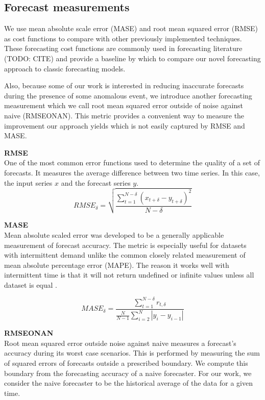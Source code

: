 \subsection{Forecast measurements}
We use mean absolute scale error (MASE) \cite{Hyndman2006, Hyndman2006a} and root mean squared error (RMSE) as cost functions to compare with other previously implemented techniques.  These forecasting cost functions are commonly used in forecasting literature (TODO: CITE) and provide a baseline by which to compare our novel forecasting approach to classic forecasting models.  

Also, because some of our work is interested in reducing inaccurate forecasts during the presence of some anomalous event, we introduce another forecasting measurement which we call root mean squared error outside of noise against naive (RMSEONAN).  This metric provides a convenient way to measure the improvement our approach yields which is not easily captured by RMSE and MASE.

\bigskip
\noindent \textbf{RMSE} \\
One of the most common error functions used to determine the quality of a set of forecasts.  It measures the average difference between two time series.  In this case, the input series $x$ and the forecast series $y$.
\begin{equation}
RMSE_{\delta} = \sqrt{\frac{\sum_{t = 1}^{N - \delta}{(x_{t + \delta} - y_{t + \delta})^{2}}}{N - \delta}}
\end{equation}

\bigskip
\noindent \textbf{MASE} \\
Mean absolute scaled error was developed to be a generally applicable measurement of forecast accuracy.  The metric is especially useful for datasets with intermittent demand unlike the common closely related measurement of mean absolute percentage error (MAPE).  The reason it works well with intermittent time is that it will not return undefined or infinite values unless all dataset is equal \cite{Hyndman2008}.

\begin{equation}
MASE_{\delta} = \frac{\sum_{t = 1}^{N - \delta}{r_{t, \delta}}}{\frac{N}{N - 1}\sum_{i = 2}^{N}|y_{i} - y_{i - 1}|}
\end{equation}

\bigskip
\noindent \textbf{RMSEONAN} \\
Root mean squared error outside noise against naive measures a forecast's accuracy during its worst case scenarios.  This is performed by measuring the sum of squared errors of forecasts outside a prescribed boundary.  We compute this boundary from the forecasting accuracy of a naive forecaster.  For our work, we consider the naive forecaster to be the historical average of the data for a given time.  

